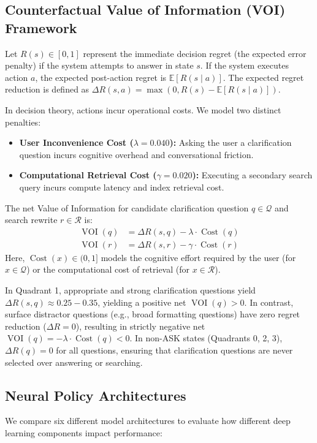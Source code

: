 \subsection{Counterfactual Value of Information (VOI) Framework}
Let $R(s) \in [0, 1]$ represent the immediate decision regret (the expected error penalty) if the system attempts to answer in state $s$. If the system executes action $a$, the expected post-action regret is $\mathbb{E}[R(s \mid a)]$. The expected regret reduction is defined as $\Delta R(s,a) = \max(0, R(s) - \mathbb{E}[R(s \mid a)])$.

In decision theory\cite{howard1966information}, actions incur operational costs. We model two distinct penalties:
\begin{itemize}
    \item \textbf{User Inconvenience Cost ($\lambda = 0.040$):} Asking the user a clarification question incurs cognitive overhead and conversational friction.
    \item \textbf{Computational Retrieval Cost ($\gamma = 0.020$):} Executing a secondary search query incurs compute latency and index retrieval cost.
\end{itemize}
The net Value of Information for candidate clarification question $q \in \mathcal{Q}$ and search rewrite $r \in \mathcal{R}$ is:
\begin{align*}
    \operatorname{VOI}(q) &= \Delta R(s,q) - \lambda \cdot \operatorname{Cost}(q) \\
    \operatorname{VOI}(r) &= \Delta R(s,r) - \gamma \cdot \operatorname{Cost}(r)
\end{align*}
Here, $\operatorname{Cost}(x)\in (0,1]$ models the cognitive effort required by the user (for $x\in\mathcal{Q}$) or the computational cost of retrieval (for $x\in\mathcal{R}$).

In Quadrant 1, appropriate and strong clarification questions yield $\Delta R(s,q) \approx 0.25 - 0.35$, yielding a positive net $\operatorname{VOI}(q) > 0$. In contrast, surface distractor questions (e.g., broad formatting questions) have zero regret reduction ($\Delta R = 0$), resulting in strictly negative net $\operatorname{VOI}(q) = -\lambda \cdot \operatorname{Cost}(q) < 0$. In non-ASK states (Quadrants 0, 2, 3), $\Delta R(q) = 0$ for all questions, ensuring that clarification questions are never selected over answering or searching.

\subsection{Neural Policy Architectures}
We compare six different model architectures to evaluate how different deep learning components impact performance:

